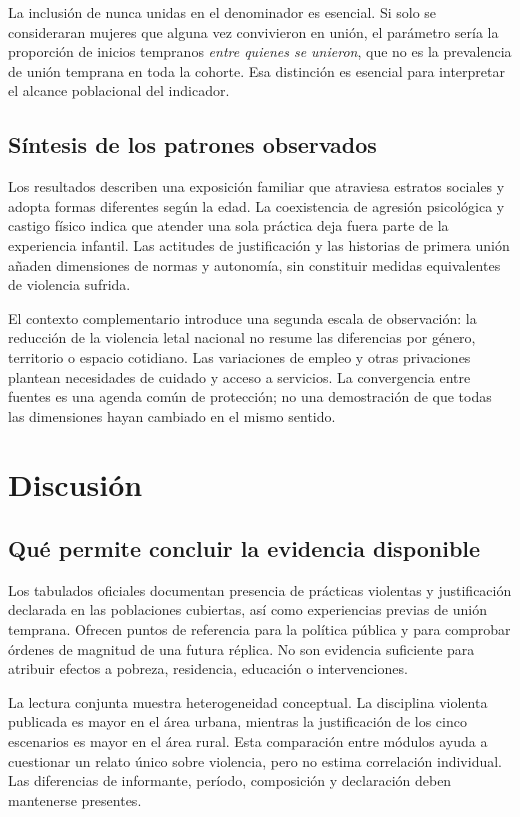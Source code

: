 \documentclass[11pt,a4paper]{article}
\begin{document}
La inclusión de nunca unidas en el denominador es esencial. Si solo se
consideraran mujeres que alguna vez convivieron en unión, el parámetro sería
la proporción de inicios tempranos \emph{entre quienes se unieron}, que no es
la prevalencia de unión temprana en toda la cohorte. Esa distinción es
esencial para interpretar el alcance poblacional del indicador.





\subsection{Síntesis de los patrones observados}
Los resultados describen una exposición familiar que atraviesa estratos
sociales y adopta formas diferentes según la edad. La coexistencia de
agresión psicológica y castigo físico indica que atender una sola práctica
deja fuera parte de la experiencia infantil. Las actitudes de justificación
y las historias de primera unión añaden dimensiones de normas y autonomía,
sin constituir medidas equivalentes de violencia sufrida.

El contexto complementario introduce una segunda escala de observación:
la reducción de la violencia letal nacional no resume las diferencias por
género, territorio o espacio cotidiano. Las variaciones de empleo y otras
privaciones plantean necesidades de cuidado y acceso a servicios. La
convergencia entre fuentes es una agenda común de protección; no una
demostración de que todas las dimensiones hayan cambiado en el mismo sentido.

\FloatBarrier
\section{Discusión}
\subsection{Qué permite concluir la evidencia disponible}
Los tabulados oficiales documentan presencia de prácticas violentas y
justificación declarada en las poblaciones cubiertas, así como experiencias
previas de unión temprana. Ofrecen puntos de referencia para la política
pública y para comprobar órdenes de magnitud de una futura réplica. No son
evidencia suficiente para atribuir efectos a pobreza, residencia, educación
o intervenciones.

La lectura conjunta muestra heterogeneidad conceptual. La disciplina violenta
publicada es mayor en el área urbana, mientras la justificación de los cinco
escenarios es mayor en el área rural. Esta comparación entre módulos ayuda
a cuestionar un relato único sobre violencia, pero no estima correlación
individual. Las diferencias de informante, período, composición y declaración
deben mantenerse presentes.
\end{document}
